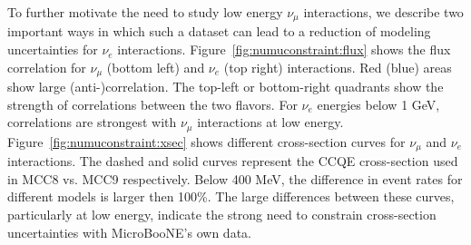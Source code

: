\documentclass[a4paper]{article}
\begin{document}
\par To further motivate the need to study low energy $\nu_{\mu}$ interactions, we describe two important ways in which such a dataset can lead to a reduction of modeling uncertainties for $\nu_e$ interactions. Figure~\ref{fig:numuconstraint:flux} shows the flux correlation for $\nu_{\mu}$ (bottom left) and $\nu_e$ (top right) interactions. Red (blue) areas show large (anti-)correlation. The top-left or bottom-right quadrants show the strength of correlations between the two flavors. For $\nu_e$ energies below 1 GeV, correlations are strongest with $\nu_{\mu}$ interactions at low energy. Figure~\ref{fig:numuconstraint:xsec} shows different cross-section curves for $\nu_{\mu}$ and $\nu_e$ interactions. The dashed and solid curves represent the CCQE cross-section used in MCC8 vs. MCC9 respectively. Below 400 MeV, the difference in event rates for different models is larger then 100\%. The large differences between these curves, particularly at low energy, indicate the strong need to constrain cross-section uncertainties with MicroBooNE's own data. 
\end{document}
